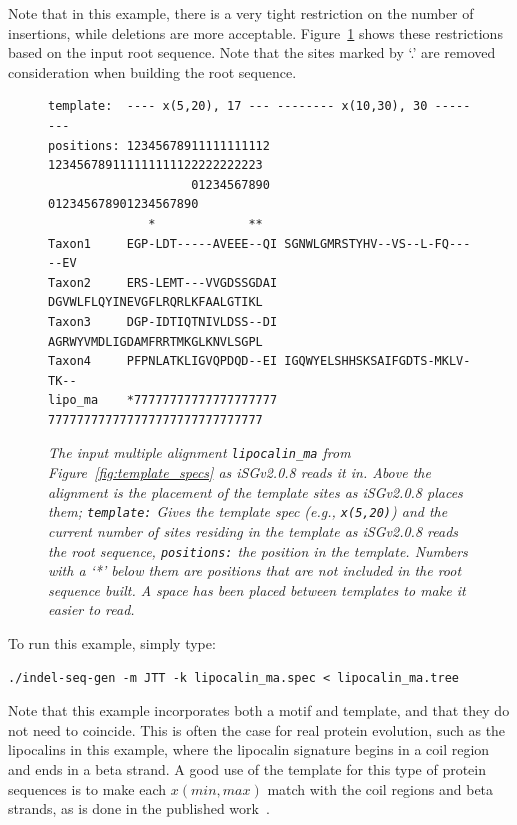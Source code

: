 \documentclass[10pt]{article}
\newcommand{\version}{2.0.8 }
\newcommand{\iSGcurrentshort}{iSGv\version }
\begin{document}
Note that in this example, there is a very tight restriction on the number of insertions, while deletions are more acceptable. Figure~\ref{fig:template_restrictions} shows these restrictions based on the input root sequence. Note that the sites marked by `.' are removed consideration when building the root sequence.

\begin{figure}[htbp]
\begin{verbatim}
template:  ---- x(5,20), 17 --- -------- x(10,30), 30 --------
positions: 12345678911111111112 123456789111111111122222222223
                    01234567890          012345678901234567890
              *             **
Taxon1     EGP-LDT-----AVEEE--QI SGNWLGMRSTYHV--VS--L-FQ-----EV
Taxon2     ERS-LEMT---VVGDSSGDAI DGVWLFLQYINEVGFLRQRLKFAALGTIKL
Taxon3     DGP-IDTIQTNIVLDSS--DI AGRWYVMDLIGDAMFRRTMKGLKNVLSGPL
Taxon4     PFPNLATKLIGVQPDQD--EI IGQWYELSHHSKSAIFGDTS-MKLV-TK--
lipo_ma    *77777777777777777777 777777777777777777777777777777
\end{verbatim}
\caption{\textit{The input multiple alignment {\tt lipocalin\_ma} from Figure~\ref{fig:template_specs} as \iSGcurrentshort reads it in. Above the alignment is the placement of the template sites as \iSGcurrentshort places them; {\tt template:} Gives the template spec (e.g., {\tt x(5,20)}) and the current number of sites residing in the template as \iSGcurrentshort reads the root sequence, {\tt positions:} the position in the template. Numbers with a `*' below them are positions that are not included in the root sequence built. A space has been placed between templates to make it easier to read.}}
\label{fig:template_restrictions}
\end{figure}

To run this example, simply type:

\begin{verbatim}
./indel-seq-gen -m JTT -k lipocalin_ma.spec < lipocalin_ma.tree
\end{verbatim}

Note that this example incorporates both a motif and template, and that they do not need to coincide. This is often the case for real protein evolution, such as the lipocalins in this example, where the lipocalin signature begins in a coil region and ends in a beta strand. A good use of the template for this type of protein sequences is to make each $x(min,max)$ match with the coil regions and beta strands, as is done in the published work~\cite{Strope09}.

\newpage


\end{document}
